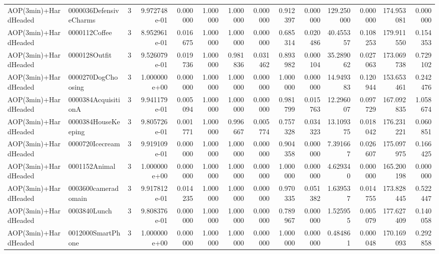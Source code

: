 \begin{tabular}{llrr|r|rr|rr|rr|rrr}
     AOP(3min)+HardHeaded & 0000036DefensiveCharms &       3 & 9.972748e-01 & 0.000000 & 1.000000 &      1.000000 & 0.000000 &      0.912397 & 0.000000 &    129.250000 &    0.000000 &   174.953081 &    0.000000 \\
     AOP(3min)+HardHeaded &          0000112Coffee &       3 & 8.952961e-01 & 0.016675 & 1.000000 &      1.000000 & 0.000000 &      0.685314 & 0.020486 &     40.455357 &    0.108253 &   179.911550 &    0.154353 \\
     AOP(3min)+HardHeaded &          0000128Outfit &       3 & 9.526079e-01 & 0.019736 & 1.000000 &      0.981836 & 0.031462 &      0.893982 & 0.000104 &     35.289062 &    0.027063 &   173.069738 &    0.729102 \\
     AOP(3min)+HardHeaded &     0000270DogChoosing &       3 & 1.000000e+00 & 0.000000 & 1.000000 &      1.000000 & 0.000000 &      1.000000 & 0.000000 &     14.949383 &    0.120944 &   153.653461 &    0.242476 \\
     AOP(3min)+HardHeaded &    0000384AcquisitionA &       3 & 9.941179e-01 & 0.005094 & 1.000000 &      1.000000 & 0.000000 &      0.981799 & 0.015763 &     12.296007 &    0.097729 &   167.092835 &    1.058674 \\
     AOP(3min)+HardHeaded &    0000384HouseKeeping &       3 & 9.805726e-01 & 0.001771 & 1.000000 &      0.996667 & 0.005774 &      0.757328 & 0.034323 &     13.109375 &    0.018042 &   176.231221 &    0.060851 \\
     AOP(3min)+HardHeaded &        0000720Icecream &       3 & 9.919109e-01 & 0.000000 & 1.000000 &      1.000000 & 0.000000 &      0.904358 & 0.000000 &      7.391667 &    0.026607 &   175.097975 &    0.166425 \\
     AOP(3min)+HardHeaded &          0001152Animal &       3 & 1.000000e+00 & 0.000000 & 1.000000 &      1.000000 & 0.000000 &      1.000000 & 0.000000 &      4.629340 &    0.000000 &   165.200198 &    0.000000 \\
     AOP(3min)+HardHeaded &    0003600cameradomain &       3 & 9.917812e-01 & 0.014235 & 1.000000 &      1.000000 & 0.000000 &      0.970335 & 0.051382 &      1.639537 &    0.014755 &   173.828445 &    0.522447 \\
     AOP(3min)+HardHeaded &           0003840Lunch &       3 & 9.808376e-01 & 0.000000 & 1.000000 &      1.000000 & 0.000000 &      0.789967 & 0.000000 &      1.525955 &    0.005079 &   177.627409 &    0.140058 \\
     AOP(3min)+HardHeaded &      0012000SmartPhone &       3 & 1.000000e+00 & 0.000000 & 1.000000 &      1.000000 & 0.000000 &      1.000000 & 0.000000 &      0.484861 &    0.000048 &   170.169093 &    0.292858 \\

\end{tabular}
